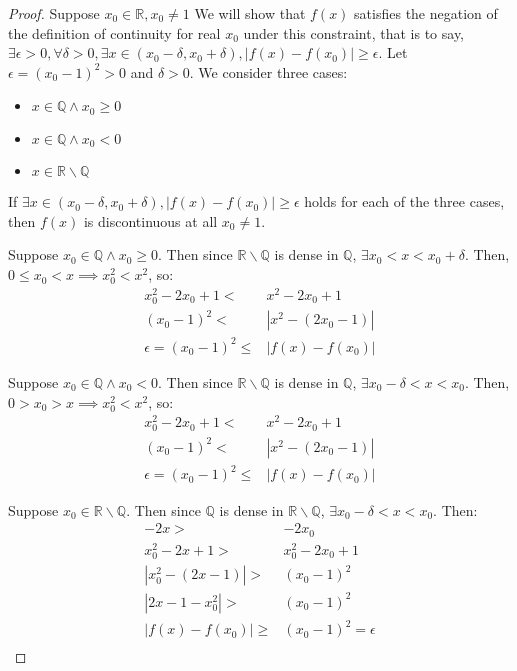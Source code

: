 \documentclass{article}
\newcommand{\reals}{\ensuremath{\mathbb{R}}}
\newcommand{\rats}{\ensuremath{\mathbb{Q}}}
\newcommand{\irats}{\ensuremath{\reals \backslash \rats}}
\newcommand{\eps}{\ensuremath{\epsilon}}
\begin{document}
\begin{proof}
	Suppose $x_0 \in \reals, x_0 \neq 1$
	We will show that $f(x)$ satisfies the negation of the definition of continuity
	for real $x_0$ under this constraint,
	that is to say,
	$\exists \eps > 0,
	\forall \delta > 0,
	\exists x \in (x_0 - \delta, x_0 + \delta),
	|f(x) - f(x_0)| \geq \eps$.
	Let $\eps = (x_0 - 1)^2 > 0$ and $\delta > 0$.
	We consider three cases:
	\begin{itemize}
		\item $x \in \rats \land x_0 \geq 0$
		\item $x \in \rats \land x_0 < 0$
		\item $x \in \irats$
	\end{itemize}
	If
	$\exists x \in (x_0 - \delta, x_0 + \delta),
	|f(x) - f(x_0)| \geq \eps$
	holds for each of the three cases,
	then $f(x)$ is discontinuous at all $x_0 \neq 1$.

	Suppose $x_0 \in \rats \land x_0 \geq 0$.
	Then since $\irats$ is dense in $\rats$,
	$\exists x_0 < x < x_0 + \delta$.
	Then, $0 \le x_0 < x \implies x_0^2 < x^2$,
	so:
	\begin{align}
		x_0^2 -2x_0 + 1 < & x^2 - 2x_0 + 1 \\
		(x_0 -1)^2 < & |x^2 - (2x_0 - 1)| \\
		\eps = (x_0 - 1)^2 \le & |f(x) - f(x_0)|
	\end{align}

	Suppose $x_0 \in \rats \land x_0 < 0$.
	Then since $\irats$ is dense in $\rats$,
	$\exists x_0 - \delta < x < x_0$.
	Then, $0 > x_0 > x \implies x_0^2 < x^2$,
	so:
	\begin{align}
		x_0^2 -2x_0 + 1 < & x^2 - 2x_0 + 1 \\
		(x_0 -1)^2 < & |x^2 - (2x_0 - 1)| \\
		\eps = (x_0 - 1)^2 \le & |f(x) - f(x_0)|
	\end{align}

	Suppose $x_0 \in \irats$.
	Then since $\rats$ is dense in $\irats$,
	$\exists x_0 - \delta < x < x_0$.
	Then:
	\begin{align}
		-2x > &-2x_0 \\
		x_0^2 - 2x + 1 > & x_0^2 - 2x_0 + 1 \\
		|x_0^2 - (2x -1)| > & (x_0 - 1)^2 \\
		|2x -1 - x_0^2| > & (x_0 - 1)^2 \\
		|f(x) - f(x_0)| \geq & (x_0 - 1)^2 = \eps\\
	\end{align}
	

\end{proof}
\end{document}
